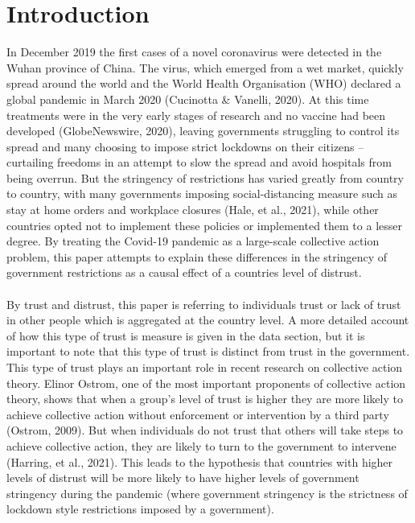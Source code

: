 \documentclass[
  11pt,
]{article}
\begin{document}
\hypertarget{introduction}{%
\section{Introduction}\label{introduction}}

In December 2019 the first cases of a novel coronavirus were detected in the Wuhan province of China. The virus, which emerged from a wet market, quickly spread around the world and the World Health Organisation (WHO) declared a global pandemic in March 2020 (Cucinotta \& Vanelli, 2020). At this time treatments were in the very early stages of research and no vaccine had been developed (GlobeNewswire, 2020), leaving governments struggling to control its spread and many choosing to impose strict lockdowns on their citizens -- curtailing freedoms in an attempt to slow the spread and avoid hospitals from being overrun. But the stringency of restrictions has varied greatly from country to country, with many governments imposing social-distancing measure such as stay at home orders and workplace closures (Hale, et al., 2021), while other countries opted not to implement these policies or implemented them to a lesser degree. By treating the Covid-19 pandemic as a large-scale collective action problem, this paper attempts to explain these differences in the stringency of government restrictions as a causal effect of a countries level of distrust.\\
~\\
By trust and distrust, this paper is referring to individuals trust or lack of trust in other people which is aggregated at the country level. A more detailed account of how this type of trust is measure is given in the data section, but it is important to note that this type of trust is distinct from trust in the government. This type of trust plays an important role in recent research on collective action theory. Elinor Ostrom, one of the most important proponents of collective action theory, shows that when a group's level of trust is higher they are more likely to achieve collective action without enforcement or intervention by a third party (Ostrom, 2009). But when individuals do not trust that others will take steps to achieve collective action, they are likely to turn to the government to intervene (Harring, et al., 2021). This leads to the hypothesis that countries with higher levels of distrust will be more likely to have higher levels of government stringency during the pandemic (where government stringency is the strictness of lockdown style restrictions imposed by a government).\\
\end{document}
